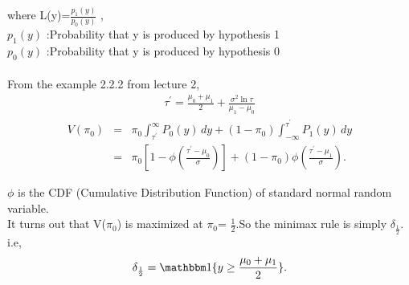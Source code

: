\documentclass[12pt]{report}
\begin{document}
\begin{exmp}
\noindent where L(y)=$\frac{p_1(y)}{p_0(y)}$ , \\
$p_1(y)$ :Probability that y is produced by hypothesis 1\\
$p_0(y)$ :Probability that y is produced by hypothesis 0
\\ \\
\noindent From the example 2.2.2 from lecture 2,
\begin{align}
 \nonumber  \tau^\prime = \frac {\mu_0+\mu_1}{2}+\frac{{\sigma}^2 \ln\tau}{\mu_1-\mu_0}
\end{align}
\begin{eqnarray}
   \nonumber   V(\pi_0)\nonumber &=&\pi_0 \int_{\tau^\prime}^{\infty} P_0(y) \,dy + (1 - \pi_0) \int_{-\infty}^{\tau^\prime} P_1(y) \,dy \\
&=& \pi_0 [1 - \phi(\frac{\tau^\prime - \mu_0}{\sigma})] + (1 - \pi_0) \phi(\frac{\tau^\prime - \mu_1}{\sigma}).
\end{eqnarray}

\noindent $\phi$ is the CDF (Cumulative Distribution Function) of standard normal random variable.\\
It turns out that V($\pi_0$) is maximized at $\pi_0$= $\frac{1}{2}$.So the minimax rule is simply $\delta_{\frac{1}{2}}$. i.e,
\begin{equation}
  \nonumber    \delta_{\frac{1}{2}} = \indic{ y \geq \frac {\mu_0+\mu_1}{2} }.
\end{equation}

\end{exmp}



\end{document}
